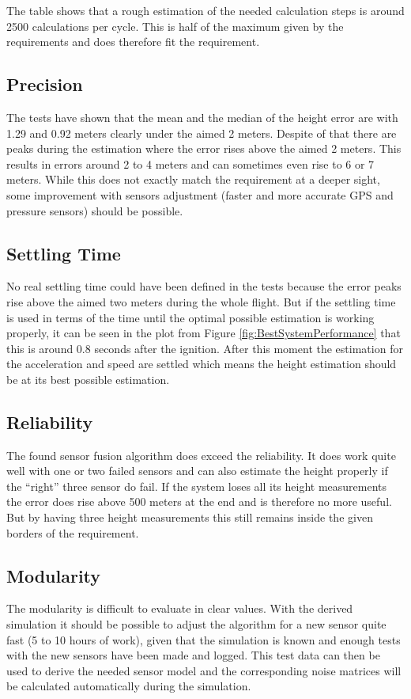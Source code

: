 The table shows that a rough estimation of the needed calculation steps is around 2500 calculations per cycle.
This is half of the maximum given by the requirements and does therefore fit the requirement.


 \subsection{Precision}
 The tests have shown that the mean and the median of the height error are with 1.29 and 0.92 meters clearly under the aimed 2 meters.
 Despite of that there are peaks during the estimation where the error rises above the aimed 2 meters.
 This results in errors around 2 to 4 meters and can sometimes even rise to 6 or 7 meters.
 While this does not exactly match the requirement at a deeper sight, some improvement with sensors adjustment (faster and more accurate GPS and pressure sensors) should be possible.

 \subsection{Settling Time}
 No real settling time could have been defined in the tests because the error peaks rise above the aimed two meters during the whole flight.
 But if the settling time is used in terms of the time until the optimal possible estimation is working properly,
 it can be seen in the plot from Figure \ref{fig:BestSystemPerformance} that this is around 0.8 seconds after the ignition.
 After this moment the estimation for the acceleration and speed are settled which means the height estimation should be at its best possible estimation.

 \subsection{Reliability}
 The found sensor fusion algorithm does exceed the reliability.
 It does work quite well with one or two failed sensors and can also estimate the height properly if the ``right'' three sensor do fail.
 If the system loses all its height measurements the error does rise above 500 meters at the end and is therefore no more useful.
 But by having three height measurements this still remains inside the given borders of the requirement.

 \subsection{Modularity}
 The modularity is difficult to evaluate in clear values.
 With the derived simulation it should be possible to adjust the algorithm for a new sensor quite fast (5 to 10 hours of work),
 given that the simulation is known and enough tests with the new sensors have been made and logged.
 This test data can then be used to derive the needed sensor model and the corresponding noise matrices will be calculated automatically during the simulation.


